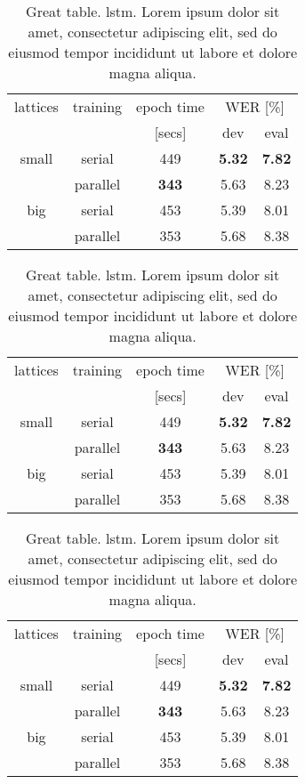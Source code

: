 \begin{table}
\centering
\caption{Great table. \Gls{lstm}.
Lorem ipsum dolor sit amet, consectetur adipiscing elit,
sed do eiusmod tempor incididunt ut labore et dolore magna aliqua.}
\label{tab:chap5:sth2}
\begin{tabular}{|c|c|c|c|c|}
\hline
lattices & training & epoch time & \multicolumn{2}{c|}{WER [\%]} \\
{}       & {}       & [secs]  & dev & eval \\ \hline \hline
small    & serial & 449  & \textbf{5.32} & \textbf{7.82} \\ \cline{2-5}
{}       & parallel & \textbf{343}  & 5.63 & 8.23 \\ \hline \hline
big      & serial   &   453        & 5.39 & 8.01 \\ \cline{2-5}
{}       & parallel &   353        & 5.68 & 8.38 \\ \hline
\end{tabular}
\end{table}


\begin{table}
\centering
\caption{Great table. \Gls{lstm}.
Lorem ipsum dolor sit amet, consectetur adipiscing elit,
sed do eiusmod tempor incididunt ut labore et dolore magna aliqua.}
\label{tab:chap5:sth3}
\begin{tabular}{|c|c|c|c|c|}
\hline
lattices & training & epoch time & \multicolumn{2}{c|}{WER [\%]} \\
{}       & {}       & [secs]  & dev & eval \\ \hline \hline
small    & serial & 449  & \textbf{5.32} & \textbf{7.82} \\ \cline{2-5}
{}       & parallel & \textbf{343}  & 5.63 & 8.23 \\ \hline \hline
big      & serial   &   453        & 5.39 & 8.01 \\ \cline{2-5}
{}       & parallel &   353        & 5.68 & 8.38 \\ \hline
\end{tabular}
\end{table}


\begin{table}
\centering
\caption{Great table. \Gls{lstm}.
Lorem ipsum dolor sit amet, consectetur adipiscing elit,
sed do eiusmod tempor incididunt ut labore et dolore magna aliqua.}
\label{tab:chap5:sth4}
\begin{tabular}{|c|c|c|c|c|}
\hline
lattices & training & epoch time & \multicolumn{2}{c|}{WER [\%]} \\
{}       & {}       & [secs]  & dev & eval \\ \hline \hline
small    & serial & 449  & \textbf{5.32} & \textbf{7.82} \\ \cline{2-5}
{}       & parallel & \textbf{343}  & 5.63 & 8.23 \\ \hline \hline
big      & serial   &   453        & 5.39 & 8.01 \\ \cline{2-5}
{}       & parallel &   353        & 5.68 & 8.38 \\ \hline
\end{tabular}
\end{table}


